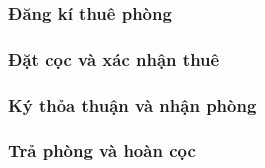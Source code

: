 
%
\subsubsection{Đăng kí thuê phòng}






\subsubsection{Đặt cọc và xác nhận thuê}






\subsubsection{Ký thỏa thuận và nhận phòng}






\subsubsection{Trả phòng và hoàn cọc}




